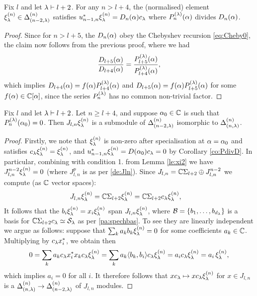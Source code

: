 \begin{corollary}\label{co:PdivD} Fix $l$ and let $\lambda\vdash l+2$. For any $n > l+4$, the (normalised) element $\xi^{(n)}_\lambda\in \Delta^{(n)}_{(n-2,\lambda)}$ satisfies $u_{n-1,n}^* \xi^{(n)}_\lambda=D_n(\alpha) c_\lambda$ where $P_n^{(\lambda)}(\alpha)$ divides $D_n(\alpha)$.
\end{corollary} 

\begin{proof}
Since for $n>l+5$, the $D_n(\alpha)$ obey the Chebyshev recursion \eqref{eq:Cheby0}, the claim now follows from the previous proof, where we had
\[\frac{D_{l+5}(\alpha)}{D_{l+4}(\alpha)}=\frac{P_{l+5}^{(\lambda)}(\alpha)}{P_{l+4}^{(\lambda)}(\alpha)},\]
which implies $D_{l+4}(\alpha)=f(\alpha) P^{(\lambda)}_{l+4}(\alpha)$ and $D_{l+5}(\alpha)=f(\alpha) P^{(\lambda)}_{l+5}(\alpha)$ for some $f(\alpha)\in \mathbb{C}[\alpha]$, since the series $P^{(\lambda)}_{n}$ has no common non-trivial factor.
\end{proof}


\begin{theorem} Fix $l$ and let $\lambda\vdash l+2$. Let $n\geq l+4$, and suppose $\alpha_0\in \mathbb{C}$ is such that $P_n^{(\lambda)}(\alpha_0)=0$. 
Then 
$J_{l,n} \xi^{(n)}_\lambda$ is a submodule of $\Delta^{(n)}_{(n-2,\lambda)}$ isomorphic to $\Delta^{(n)}_{(n,\lambda)}$. 
\end{theorem} 
\begin{proof} 
Firstly, we note that $\xi^{(n)}_\lambda$ is non-zero after specialisation at $\alpha=\alpha_0$ and satisfies $c_\lambda \xi^{(n)}_\lambda=\xi^{(n)}_\lambda$, and $u_{n-1,n}^* \xi^{(n)}_\lambda=D(\alpha_0) c_\lambda=0$ by Corollary \ref{co:PdivD}. In particular, combining with condition 1. from Lemma \ref{le:xi2} we have $J_{l,n}^{n-2} \xi^{(n)}_{\lambda}=0$ (where $J_{l,n}^{p}$ is as per \ref{de:Jln}). Since $J_{l,n}=\mathbb{C} \Sigma_{l+2}\oplus J_{l,n}^{n-2}$ we compute (as $\mathbb{C}$ vector spaces):
\begin{align*} J_{l,n}\xi^{(n)}_\lambda&=\mathbb{C} \Sigma_{l+2} \xi^{(n)}_\lambda= \mathbb{C} \Sigma_{l+2} c_\lambda \xi^{(n)}_\lambda,   
\end{align*}
    It follows that the $b_i \xi^{(n)}_\lambda= x_i \xi^{(n)}_\lambda $ span $J_{l,n}\xi^{(n)}_\lambda$, where $\mathcal{B}=\{b_1,\dots, b_{d_{\lambda}}\}$ is a basis for $\mathbb{C} \Sigma_{l+2} c_\lambda \simeq \mathcal{S}_\lambda$ as per \ref{pa:spechbas}. To see they are linearly independent we argue as follows: suppose that $\sum_k a_k b_k \xi^{(n)}_\lambda=0$ for some coefficients $a_k\in \mathbb{C}$. Multiplying by $c _\lambda x_{i}^*$, we obtain then
    \[
    0=\sum_k a_k c _\lambda x_{i}^* x_k c_\lambda \xi^{(n)}_\lambda=\sum_k a_k \langle b_k, b_i\rangle c_\lambda \xi^{(n)}_\lambda= a_i c_\lambda \xi^{(n)}_\lambda =a_i \, \xi^{(n)}_\lambda,
    \]
    which implies $a_i=0$ for all $i$. It therefore follows that $x c_\lambda \mapsto x c_\lambda \xi_\lambda^{(n)} $ for $x\in J_{l,n}$ is a  $\Delta^{(n)}_{(n,\lambda)}\to \Delta^{(n)}_{(n-2,\lambda)} $ 
    of $J_{l,n}$ modules. 
    \end{proof}


